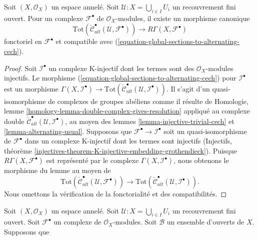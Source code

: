 {\begin{lemma}

\label{lemma-alternating-cech-complex-complex}

Soit $(X, \mathcal{O}_X)$ un espace annelé. Soit $\mathcal{U} : X = \bigcup_{i \in I} U_i$ un recouvrement fini ouvert. Pour un complexe $\mathcal{F}^\bullet$
de $\mathcal{O}_X$-modules, il existe un morphisme canonique
$$
\text{Tot}(\check{\mathcal{C}}^\bullet_{alt}(\mathcal{U}, \mathcal{F}^\bullet))
\longrightarrow
R\Gamma(X, \mathcal{F}^\bullet)
$$
fonctoriel en $\mathcal{F}^\bullet$ et compatible avec (\ref{equation-global-sections-to-alternating-cech}).

\end{lemma}

\begin{proof}

Soit ${\mathcal I}^\bullet$ un complexe K-injectif dont les termes sont des $\mathcal{O}_X$-modules injectifs. Le morphisme (\ref{equation-global-sections-to-alternating-cech}) pour
$\mathcal{I}^\bullet$ est un morphisme
$\Gamma(X, {\mathcal I}^\bullet) \to
\text{Tot}(\check{\mathcal{C}}^\bullet_{alt}({\mathcal U},
{\mathcal I}^\bullet))$. Il s'agit d'un quasi-isomorphisme de complexes de groupes abéliens comme il résulte de Homologie, lemme \ref{homology-lemma-double-complex-gives-resolution}
appliqué au complexe double
$\check{\mathcal{C}}^\bullet_{alt}({\mathcal U},
{\mathcal I}^\bullet)$, au moyen des lemmes \ref{lemma-injective-trivial-cech} et \ref{lemma-alternating-usual}. Supposons que ${\mathcal F}^\bullet \to {\mathcal I}^\bullet$ soit un quasi-isomorphisme de ${\mathcal F}^\bullet$ dans un complexe K-injectif dont les termes sont injectifs (Injectifs, théorème
\ref{injectives-theorem-K-injective-embedding-grothendieck}). Puisque $R\Gamma(X, {\mathcal F}^\bullet)$ est représenté par le complexe
$\Gamma(X, {\mathcal I}^\bullet)$, nous obtenons le morphisme du lemme au moyen de
$$
\text{Tot}(\check{\mathcal{C}}^\bullet_{alt}({\mathcal U},
{\mathcal F}^\bullet))
\longrightarrow
\text{Tot}(\check{\mathcal{C}}^\bullet_{alt}({\mathcal U},
{\mathcal I}^\bullet)).
$$
Nous omettons la vérification de la fonctorialité et des compatibilités.

\end{proof}

\begin{lemma}

\label{lemma-alternating-cech-complex-complex-ss}

Soit $(X, \mathcal{O}_X)$ un espace annelé.
Soit $\mathcal{U} : X = \bigcup_{i \in I} U_i$ un recouvrement fini ouvert.
Soit $\mathcal{F}^\bullet$ un complexe de $\mathcal{O}_X$-modules. Soit $\mathcal{B}$ un ensemble d'ouverts de $X$. Supposons que


\end{lemma}}

